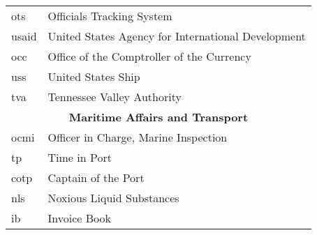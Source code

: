 \begin{tabular}{ll}
    ots             &Officials Tracking System\\
    usaid           &United States Agency for International Development\\
    occ             &Office of the Comptroller of the Currency\\
    uss             &United States Ship\\
    tva             &Tennessee Valley Authority\\
    \midrule
    \multicolumn{2}{c}{\bfseries Maritime Affairs and Transport}\\
    \midrule
    ocmi            &Officer in Charge, Marine Inspection\\
    tp              &Time in Port\\
    cotp            &Captain of the Port\\
    nls             &Noxious Liquid Substances\\
    ib              &Invoice Book\\
    \bottomrule
\end{tabular}